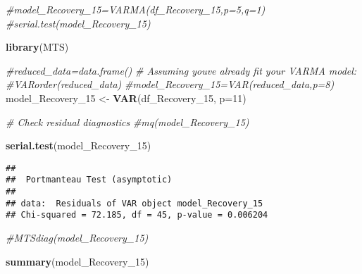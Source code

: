 \documentclass[
]{article}
\newenvironment{Shaded}{\begin{snugshade}}{\end{snugshade}}
\newcommand{\AttributeTok}[1]{\textcolor[rgb]{0.13,0.29,0.53}{#1}}
\newcommand{\CommentTok}[1]{\textcolor[rgb]{0.56,0.35,0.01}{\textit{#1}}}
\newcommand{\DecValTok}[1]{\textcolor[rgb]{0.00,0.00,0.81}{#1}}
\newcommand{\FunctionTok}[1]{\textcolor[rgb]{0.13,0.29,0.53}{\textbf{#1}}}
\newcommand{\NormalTok}[1]{#1}
\newcommand{\OtherTok}[1]{\textcolor[rgb]{0.56,0.35,0.01}{#1}}
\begin{document}
\begin{Shaded}
\begin{Highlighting}[]
\CommentTok{\#model\_Recovery\_15=VARMA(df\_Recovery\_15,p=5,q=1)}
\CommentTok{\#serial.test(model\_Recovery\_15)}



\FunctionTok{library}\NormalTok{(MTS)}

\CommentTok{\#reduced\_data=data.frame()}
\CommentTok{\# Assuming you\textquotesingle{}ve already fit your VARMA model:}
\CommentTok{\#VARorder(reduced\_data)}
\CommentTok{\#model\_Recovery\_15=VAR(reduced\_data,p=8)}
\NormalTok{model\_Recovery\_15 }\OtherTok{\textless{}{-}} \FunctionTok{VAR}\NormalTok{(df\_Recovery\_15, }\AttributeTok{p=}\DecValTok{11}\NormalTok{)}
\end{Highlighting}
\end{Shaded}

\begin{Shaded}
\begin{Highlighting}[]
\CommentTok{\# Check residual diagnostics}
\CommentTok{\#mq(model\_Recovery\_15)}


\FunctionTok{serial.test}\NormalTok{(model\_Recovery\_15)}
\end{Highlighting}
\end{Shaded}

\begin{verbatim}
## 
##  Portmanteau Test (asymptotic)
## 
## data:  Residuals of VAR object model_Recovery_15
## Chi-squared = 72.185, df = 45, p-value = 0.006204
\end{verbatim}

\begin{Shaded}
\begin{Highlighting}[]
\CommentTok{\#MTSdiag(model\_Recovery\_15)}
\end{Highlighting}
\end{Shaded}

\begin{Shaded}
\begin{Highlighting}[]
\FunctionTok{summary}\NormalTok{(model\_Recovery\_15)}
\end{Highlighting}
\end{Shaded}
\end{document}
